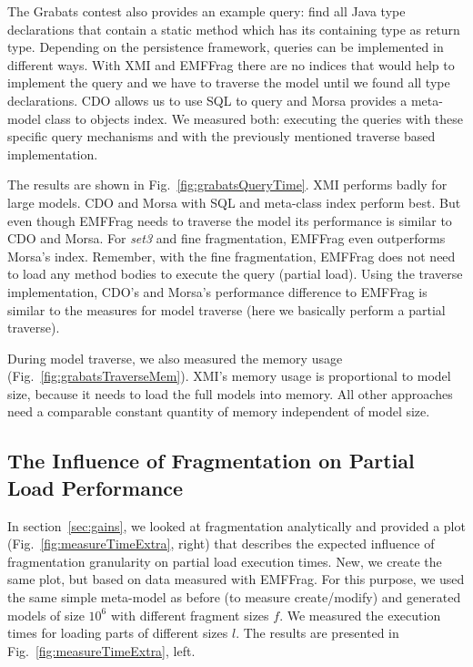  The Grabats contest also provides an example query: find all Java type declarations that contain a static method which has its containing type as return type. Depending on the persistence framework, queries can be implemented in different ways. With XMI and EMFFrag there are no indices that would help to implement the query and we have to traverse the model until we found all type declarations. CDO allows us to use SQL to query and Morsa provides a meta-model class to objects index. We measured both: executing the queries with these specific query mechanisms and with the previously mentioned traverse based implementation.

The results are shown in Fig.~\ref{fig:grabatsQueryTime}. XMI performs badly for large models. CDO and Morsa with SQL and meta-class index perform best. But even though EMFFrag needs to traverse the model its performance is similar to CDO and Morsa. For \emph{set3} and fine fragmentation, EMFFrag even outperforms Morsa's index. Remember, with the fine fragmentation, EMFFrag does not need to load any method bodies to execute the query (partial load). Using the traverse implementation, CDO's and Morsa's performance difference to EMFFrag is similar to the measures for model traverse (here we basically perform a partial traverse).  

 During model traverse, we also measured the memory usage (Fig.~\ref{fig:grabatsTraverseMem}). XMI's memory usage is proportional to model size, because it needs to load the full models into memory. All other approaches need a comparable constant quantity of memory independent of model size.

\subsection{The Influence of Fragmentation on Partial Load Performance}

In section~\ref{sec:gains}, we looked at fragmentation analytically and provided a plot (Fig.~\ref{fig:measureTimeExtra}, right) that describes the expected influence of fragmentation granularity on partial load execution times. New, we create the same plot, but based on data measured with EMFFrag. For this purpose, we used the same simple meta-model as before (to measure create/modify) and generated models of size $10^6$ with different fragment sizes $f$. We measured the execution times for loading parts of different sizes $l$. The results are presented in Fig.~\ref{fig:measureTimeExtra}, left.

